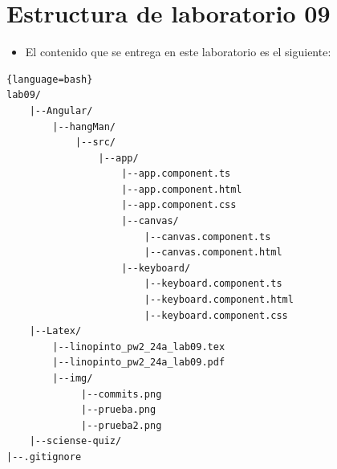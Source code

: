 \documentclass{article}
\newcommand{\itemPracticeNumber}{09}
\begin{document}
\section{Estructura de laboratorio \itemPracticeNumber}
\begin{itemize}
	\item El contenido que se entrega en este laboratorio es el siguiente:
\end{itemize}
\begin{lstlisting}{language=bash}
lab09/
	|--Angular/
		|--hangMan/
			|--src/
				|--app/
					|--app.component.ts
					|--app.component.html
					|--app.component.css
					|--canvas/
						|--canvas.component.ts
						|--canvas.component.html
					|--keyboard/
						|--keyboard.component.ts
						|--keyboard.component.html
						|--keyboard.component.css
	|--Latex/
		|--linopinto_pw2_24a_lab09.tex
		|--linopinto_pw2_24a_lab09.pdf
		|--img/
			 |--commits.png
			 |--prueba.png
			 |--prueba2.png
	|--sciense-quiz/
|--.gitignore
\end{lstlisting}
\end{document}
